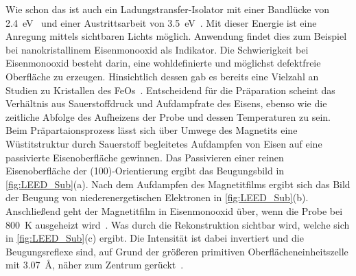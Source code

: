             Wie schon das  ist auch  ein Ladungstransfer-Isolator mit einer Bandlücke von \SI{2.4}{\electronvolt}~\cite{FeO_21} und einer Austrittsarbeit von \SI{3.5}{\electronvolt}~\cite{FeO_28}.
            Mit dieser Energie ist eine Anregung mittels sichtbaren Lichts möglich.
            Anwendung findet dies zum Beispiel bei nanokristallinem Eisenmonooxid als Indikator.
            Die Schwierigkeit bei Eisenmonooxid besteht darin, eine wohldefinierte und möglichst defektfreie Oberfläche zu erzeugen.
            Hinsichtlich dessen gab es bereits eine Vielzahl an Studien zu Kristallen des FeOs~\cite{FeO_7, FeO_19, FeO_26, FeO_23, FeO_27}.
            Entscheidend für die Präparation scheint das Verhältnis aus Sauerstoffdruck und Aufdampfrate des Eisens, ebenso wie die zeitliche Abfolge des Aufheizens der Probe und dessen Temperaturen zu sein.
            Beim Präpartaionsprozess lässt sich über Umwege des Magnetits eine Wüstitstruktur durch Sauerstoff begleitetes Aufdampfen von Eisen auf eine passivierte Eisenoberfläche gewinnen.
            Das Passivieren einer reinen Eisenoberfläche der (100)-Orientierung ergibt das Beugungsbild in \autoref{fig:LEED_Sub}(a).
            Nach dem Aufdampfen des Magnetitfilms ergibt sich das Bild der Beugung von niederenergetischen Elektronen in \autoref{fig:LEED_Sub}(b).
            Anschließend geht der Magnetitfilm in Eisenmonooxid über, wenn die Probe bei \SI{800}{\kelvin} ausgeheizt wird~\cite{FeO_1}.
            Was durch die Rekonstruktion sichtbar wird, welche sich in \autoref{fig:LEED_Sub}(c) ergibt.
            Die Intensität ist dabei invertiert und die Beugungsreflexe sind, auf Grund der größeren primitiven Oberflächeneinheitszelle mit \SI{3.07}{\angstrom}, näher zum Zentrum gerückt~\cite{FeO_1}.

